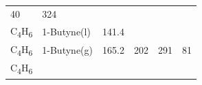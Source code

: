 \documentclass[
]{book}
\theoremstyle{definition}
\theoremstyle{definition}
\theoremstyle{definition}
\theoremstyle{remark}
\begin{document}
\begin{longtable}[]{@{}llllll@{}}
\begin{minipage}[t]{0.15\columnwidth}
40\strut
\end{minipage} & \begin{minipage}[t]{0.14\columnwidth}\raggedright
324\strut
\end{minipage} & \begin{minipage}[t]{0.14\columnwidth}\raggedright
\strut
\end{minipage}\tabularnewline
\begin{minipage}[t]{0.07\columnwidth}\raggedright
C\textsubscript{4}H\textsubscript{6}\strut
\end{minipage} & \begin{minipage}[t]{0.17\columnwidth}\raggedright
1-Butyne(l)\strut
\end{minipage} & \begin{minipage}[t]{0.15\columnwidth}\raggedright
141.4\strut
\end{minipage} & \begin{minipage}[t]{0.15\columnwidth}\raggedright
\strut
\end{minipage} & \begin{minipage}[t]{0.14\columnwidth}\raggedright
\strut
\end{minipage} & \begin{minipage}[t]{0.14\columnwidth}\raggedright
\strut
\end{minipage}\tabularnewline
\begin{minipage}[t]{0.07\columnwidth}\raggedright
C\textsubscript{4}H\textsubscript{6}\strut
\end{minipage} & \begin{minipage}[t]{0.17\columnwidth}\raggedright
1-Butyne(g)\strut
\end{minipage} & \begin{minipage}[t]{0.15\columnwidth}\raggedright
165.2\strut
\end{minipage} & \begin{minipage}[t]{0.15\columnwidth}\raggedright
202\strut
\end{minipage} & \begin{minipage}[t]{0.14\columnwidth}\raggedright
291\strut
\end{minipage} & \begin{minipage}[t]{0.14\columnwidth}\raggedright
81\strut
\end{minipage}\tabularnewline
\begin{minipage}[t]{0.07\columnwidth}\raggedright
C\textsubscript{4}H\textsubscript{6}\strut
\end{minipage} & \begin{minipage}[t]{0.17\columnwidth}\raggedright

\end{minipage}
\end{longtable}
\end{document}

